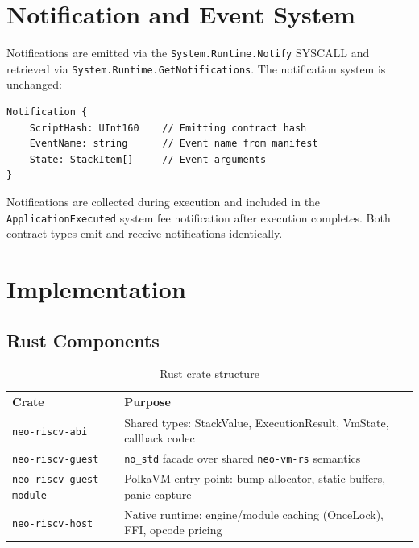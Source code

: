 \documentclass[11pt,a4paper]{article}
\begin{document}
\section{Notification and Event System}
\label{sec:notifications}

Notifications are emitted via the \texttt{System.Runtime.Notify} SYSCALL and
retrieved via \texttt{System.Runtime.GetNotifications}. The notification
system is unchanged:

\begin{lstlisting}[caption={Notification structure}]
Notification {
    ScriptHash: UInt160    // Emitting contract hash
    EventName: string      // Event name from manifest
    State: StackItem[]     // Event arguments
}
\end{lstlisting}

Notifications are collected during execution and included in the
\texttt{ApplicationExecuted} system fee notification after execution
completes. Both contract types emit and receive notifications identically.

\section{Implementation}
\label{sec:implementation}

\subsection{Rust Components}

\begin{table}[H]
\centering
\begin{tabular}{lp{8.5cm}}
\toprule
\textbf{Crate} & \textbf{Purpose} \\
\midrule
\texttt{neo-riscv-abi} & Shared types: StackValue, ExecutionResult, VmState, callback codec \\
\texttt{neo-riscv-guest} & \texttt{no\_std} facade over shared \texttt{neo-vm-rs} semantics \\
\texttt{neo-riscv-guest-module} & PolkaVM entry point: bump allocator, static buffers, panic capture \\
\texttt{neo-riscv-host} & Native runtime: engine/module caching (OnceLock), FFI, opcode pricing \\
\bottomrule
\end{tabular}
\caption{Rust crate structure}
\end{table}
\end{document}
